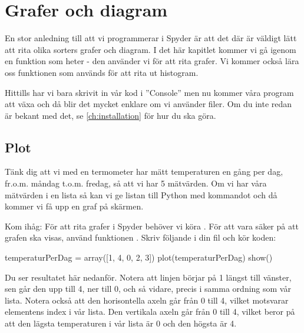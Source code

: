 %
%

\chapter{Grafer och diagram}\label{ch:grafer}
En stor anledning till att vi programmerar i Spyder är att det där är väldigt lätt att rita olika sorters grafer och diagram. I det här kapitlet kommer vi gå igenom en funktion som heter  - den använder vi för att rita grafer. Vi kommer också lära oss funktionen  som används för att rita ut histogram.

Hittills har vi bara skrivit in vår kod i ''Console'' men nu kommer våra program att växa och då blir det mycket enklare om vi använder filer. Om du inte redan är bekant med det, se \autoref{ch:installation} för hur du ska göra.

\section{Plot}

Tänk dig att vi med en termometer har mätt temperaturen en gång per dag, fr.o.m. måndag t.o.m. fredag, så att vi har 5 mätvärden. Om vi har våra mätvärden i en lista så kan vi ge listan till Python med kommandot  och då kommer vi få upp en graf på skärmen.

Kom ihåg: För att rita grafer i Spyder behöver vi köra . För att vara säker på att grafen ska visas, använd funktionen . Skriv följande i din fil och kör koden:

\begin{python}[caption={Vår första graf},label={}]
temperaturPerDag = array([1, 4, 0, 2, 3])
plot(temperaturPerDag)
show()
\end{python}

Du ser resultatet här nedanför. Notera att linjen börjar på 1 längst till vänster, sen går den upp till 4, ner till 0, och så vidare, precis i samma ordning som vår lista. Notera också att den horisontella axeln går från 0 till 4, vilket motsvarar elementens index i vår lista. Den vertikala axeln går från 0 till 4, vilket beror på att den lägsta temperaturen i vår lista är 0 och den högsta är 4.

